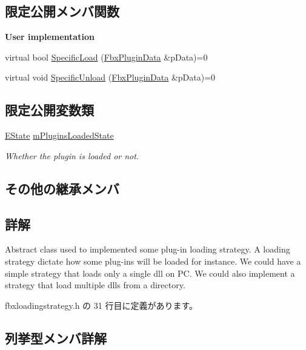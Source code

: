 \subsection*{限定公開メンバ関数}
\begin{Indent}\textbf{ User implementation}\par
\begin{DoxyCompactItemize}
\item 
virtual bool \hyperlink{class_fbx_loading_strategy_a5e1fb1dd165eeb5d4670aab41bed1659}{Specific\+Load} (\hyperlink{struct_fbx_plugin_data}{Fbx\+Plugin\+Data} \&p\+Data)=0
\item 
virtual void \hyperlink{class_fbx_loading_strategy_a22f41510c2741f68ffb96f7c3da79a85}{Specific\+Unload} (\hyperlink{struct_fbx_plugin_data}{Fbx\+Plugin\+Data} \&p\+Data)=0
\end{DoxyCompactItemize}
\end{Indent}
\subsection*{限定公開変数類}
\begin{DoxyCompactItemize}
\item 
\hyperlink{class_fbx_loading_strategy_a2f61523e78f4bb06d46ccf3351d2bcdb}{E\+State} \hyperlink{class_fbx_loading_strategy_a7ae53371abecd1686cd765d19697e1c8}{m\+Plugins\+Loaded\+State}
\begin{DoxyCompactList}\small\item\em Whether the plugin is loaded or not. \end{DoxyCompactList}\end{DoxyCompactItemize}
\subsection*{その他の継承メンバ}


\subsection{詳解}
Abstract class used to implemented some plug-\/in loading strategy. A loading strategy dictate how some plug-\/ins will be loaded for instance. We could have a simple strategy that loads only a single dll on PC. We could also implement a strategy that load multiple dlls from a directory. 

 fbxloadingstrategy.\+h の 31 行目に定義があります。



\subsection{列挙型メンバ詳解}
\mbox{\label{class_fbx_loading_strategy_a2f61523e78f4bb06d46ccf3351d2bcdb}} 
